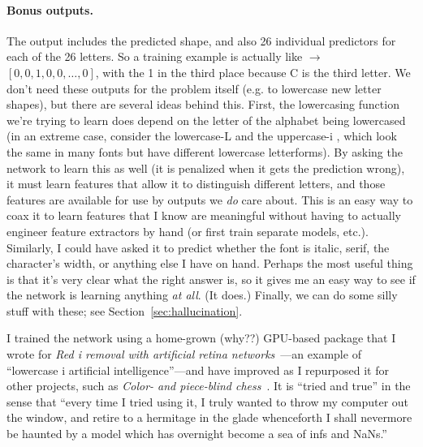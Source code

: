 \documentclass[twocolumn]{article} %
\begin{document}
\paragraph{Bonus outputs.} The output includes the predicted shape,
and also 26 individual predictors for each of the 26 letters. So a
training example is actually like  $\rightarrow$
 $[0, 0, 1, 0, 0, \ldots, 0]$, with the 1 in the third
place because C is the third letter. We don't need these outputs for
the problem itself (e.g. to lowercase new letter shapes), but there
are several ideas behind this. First, the lowercasing function we're
trying to learn does depend on the letter of the alphabet being
lowercased (in an extreme case, consider the lowercase-L
 and the uppercase-i , which look the same
in many fonts but have different lowercase letterforms). By asking the
network to learn this as well (it is penalized when it gets the
prediction wrong), it must learn features that allow it to distinguish
different letters, and those features are available for use by outputs
we {\em do} care about. This is an easy way to coax it to learn
features that I know are meaningful without having to actually
engineer feature extractors by hand (or first train separate models,
etc.). Similarly, I could have asked it to predict whether the font
is italic, serif, the character's width, or anything else I have on
hand. Perhaps the most useful thing is that it's very clear what the
right answer is, so it gives me an easy way to see if the network is
learning anything {\em at all}. (It does.) Finally, we can do some
silly stuff with these; see Section~\ref{sec:hallucination}.

\newcommand\nan{\textsf{NaN}}
\renewcommand\inf{\textsf{inf}}

I trained the network using a home-grown (why??) GPU-based package
that I wrote for {\em Red i removal with artificial retina
  networks}~\cite{murphy2015redi}---an example of ``lowercase i
artificial intelligence''---and have improved as I repurposed it for
other projects, such as {\em Color- and piece-blind
  chess}~\cite{murphy2019blind}. It is ``tried and true'' in the
sense that ``every time I tried using it, I truly wanted to throw
my computer out the window, and retire to a hermitage in the glade
whenceforth I shall nevermore be haunted by a model which has
overnight become a sea of \inf{}s and \nan{}s.''
\end{document}
